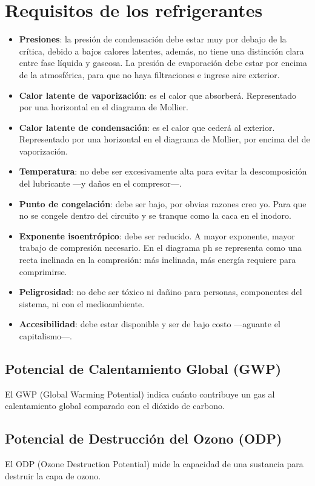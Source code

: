 \section{Requisitos de los refrigerantes}

\begin{itemize}
	\item \textbf{Presiones}: la presión de condensación debe estar muy por debajo de la crítica, debido a bajos calores latentes, además, no tiene una distinción clara entre fase líquida y gaseosa. La presión de evaporación debe estar por encima de la atmosférica, para que no haya filtraciones e ingrese aire exterior.
	\item \textbf{Calor latente de vaporización}: es el calor que absorberá. Representado por una horizontal en el diagrama de Mollier.
	\item \textbf{Calor latente de condensación}: es el calor que cederá al exterior. Representado por una horizontal en el diagrama de Mollier, por encima del de vaporización.
	\item \textbf{Temperatura}: no debe ser excesivamente alta para evitar la descomposición del lubricante —y daños en el compresor—.
	\item \textbf{Punto de congelación}: debe ser bajo, por obvias razones creo yo. Para que no se congele dentro del circuito y se tranque como la caca en el inodoro.
	\item \textbf{Exponente isoentrópico}: debe ser reducido. A mayor exponente, mayor trabajo de compresión necesario. En el diagrama ph se representa como una recta inclinada en la compresión: más inclinada, más energía requiere para comprimirse.
	\item \textbf{Peligrosidad}: no debe ser tóxico ni dañino para personas, componentes del sistema, ni con el medioambiente.
	\item \textbf{Accesibilidad}: debe estar disponible y ser de bajo costo —aguante el capitalismo—.
\end{itemize}

\subsection{Potencial de Calentamiento Global (GWP)}
El GWP (Global Warming Potential) indica cuánto contribuye un gas al calentamiento global comparado con el dióxido de carbono.

\subsection{Potencial de Destrucción del Ozono (ODP)}
El ODP (Ozone Destruction Potential) mide la capacidad de una sustancia para destruir la capa de ozono.



